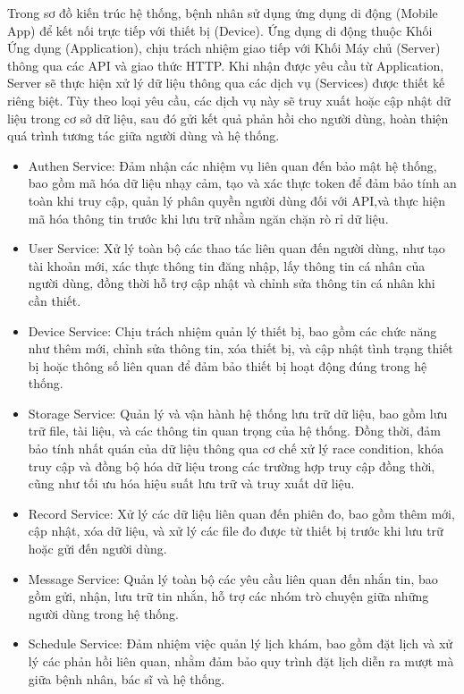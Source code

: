 Trong sơ đồ kiến trúc hệ thống, bệnh nhân sử dụng ứng dụng di động (Mobile App) để kết nối trực tiếp với thiết bị (Device).
Ứng dụng di động thuộc Khối Ứng dụng (Application), chịu trách nhiệm giao tiếp với Khối Máy chủ (Server) thông qua các API và giao thức HTTP.
Khi nhận được yêu cầu từ Application, Server sẽ thực hiện xử lý dữ liệu thông qua các dịch vụ (Services) được thiết kế riêng biệt.
Tùy theo loại yêu cầu, các dịch vụ này sẽ truy xuất hoặc cập nhật dữ liệu trong cơ sở dữ liệu, sau đó gửi kết quả phản hồi cho người dùng,
hoàn thiện quá trình tương tác giữa người dùng và hệ thống.\begin{adjustwidth}{1.5em}{}
	\begin{itemize}
		\item Authen Service: Đảm nhận các nhiệm vụ liên quan đến bảo mật hệ thống, bao gồm mã hóa dữ liệu nhạy cảm, tạo và xác thực token để đảm bảo tính an toàn khi truy cập,
		      quản lý phân quyền người dùng đối với API,và thực hiện mã hóa thông tin trước khi lưu trữ nhằm ngăn chặn rò rỉ dữ liệu.
		\item User Service: Xử lý toàn bộ các thao tác liên quan đến người dùng, như tạo tài khoản mới, xác thực thông tin đăng nhập, lấy thông tin cá nhân của người dùng,
		      đồng thời hỗ trợ cập nhật và chỉnh sửa thông tin cá nhân khi cần thiết.
		\item Device Service: Chịu trách nhiệm quản lý thiết bị, bao gồm các chức năng như thêm mới, chỉnh sửa thông tin, xóa thiết bị,
		      và cập nhật tình trạng thiết bị hoặc thông số liên quan để đảm bảo thiết bị hoạt động đúng trong hệ thống.
		\item Storage Service: Quản lý và vận hành hệ thống lưu trữ dữ liệu, bao gồm lưu trữ file, tài liệu, và các thông tin quan trọng của hệ thống.
		      Đồng thời, đảm bảo tính nhất quán của dữ liệu thông qua cơ chế xử lý race condition, khóa truy cập và đồng bộ hóa dữ liệu trong các trường hợp truy cập đồng thời,
		      cũng như tối ưu hóa hiệu suất lưu trữ và truy xuất dữ liệu.
		\item Record Service: Xử lý các dữ liệu liên quan đến phiên đo, bao gồm thêm mới, cập nhật, xóa dữ liệu, và xử lý các file đo được từ thiết bị trước khi lưu trữ hoặc gửi đến người dùng.
		\item Message Service: Quản lý toàn bộ các yêu cầu liên quan đến nhắn tin, bao gồm gửi, nhận, lưu trữ tin nhắn, hỗ trợ các nhóm trò chuyện giữa những người dùng trong hệ thống.
		\item Schedule Service: Đảm nhiệm việc quản lý lịch khám, bao gồm đặt lịch và xử lý các phản hồi liên quan, nhằm đảm bảo quy trình đặt lịch diễn ra mượt mà giữa bệnh nhân, bác sĩ và hệ thống.

\end{itemize}
\end{adjustwidth}
